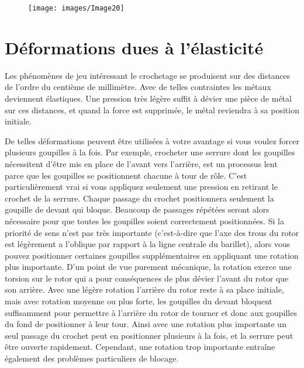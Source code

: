 \documentclass[a4paper,french,11pt,twoside]{report}
\begin{document}

\begin{figure}[ht] \begin{center}
        \texttt{[image: images/Image20]}
        \caption{}
\end{center} \end{figure}


\section{Déformations dues à l'élasticité}

Les phénomènes de jeu intéressant le crochetage se produisent sur des distances de l'ordre du centième de millimètre. Avec de telles contraintes les métaux deviennent élastiques. Une pression très légère suffit à dévier une pièce de métal sur ces distances, et quand la force est supprimée, le métal reviendra à sa position initiale.

De telles déformations peuvent être utilisées à votre avantage si vous voulez forcer plusieurs goupilles à la fois. Par exemple, crocheter une serrure dont les goupilles nécessitent d'être mis en place de l'avant vers l'arrière, est un processus lent parce que les goupilles se positionnent chacune à tour de rôle. C'est particulièrement vrai si vous appliquez seulement une pression en retirant le crochet de la serrure. Chaque passage du crochet positionnera seulement la goupille de devant qui bloque. Beaucoup de passages répétées seront alors nécessaire pour que toutes les goupilles soient correctement positionnées. Si la priorité de sens n'est pas très importante (c'est-à-dire que l'axe des trous du rotor est légèrement a l'oblique par rapport à la ligne centrale du barillet), alors vous pouvez positionner certaines goupilles supplémentaires en appliquant une rotation plus importante. D'un point de vue purement mécanique, la rotation exerce une torsion sur le rotor qui a pour conséquences de plus dévier l'avant du rotor que son arrière. Avec une légère rotation l'arrière du rotor reste à sa place initiale, mais avec rotation moyenne ou plus forte, les goupilles du devant bloquent suffisamment pour permettre à l'arrière du rotor de tourner et donc aux goupilles du fond de positionner à leur tour. Ainsi avec une rotation plus importante un seul passage du crochet peut en positionner plusieurs à la fois, et la serrure peut être ouverte rapidement. Cependant, une rotation trop importante entraîne également des problèmes particuliers de blocage.
\end{document}
